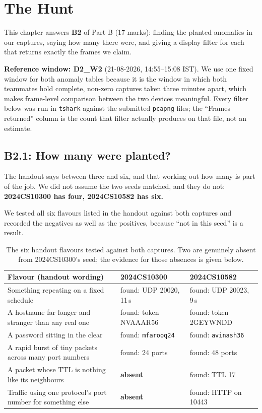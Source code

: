 \chapter{The Hunt}\label{ch:B2}

This chapter answers \textbf{B2} of Part B (17 marks): finding the planted anomalies in our
captures, saying how many there were, and giving a display filter for each that returns exactly
the frames we claim.

\textbf{Reference window: D2\_W2} (21-08-2026, 14:55--15:08 IST). We use one fixed window for
both anomaly tables because it is the window in which both teammates hold complete, non-zero
captures taken three minutes apart, which makes frame-level comparison between the two devices
meaningful. Every filter below was run in \texttt{tshark} against the submitted
\texttt{pcapng} files; the ``Frames returned'' column is the count that filter actually produces
on that file, not an estimate.

\section{B2.1: How many were planted?}

The handout says between three and six, and that working out how many is part of the job. We did
not assume the two seeds matched, and they do not: \textbf{2024CS10300 has four, 2024CS10582 has
six.}

We tested all six flavours listed in the handout against both captures and recorded the
negatives as well as the positives, because ``not in this seed'' is a result.

\begin{table}[H]
\centering
\caption{The six handout flavours tested against both captures. Two are genuinely absent from
2024CS10300's seed; the evidence for those absences is given below.}
\label{tab:b2flavours}
\footnotesize
\begin{tabular}{@{}>{\raggedright\arraybackslash}p{5.6cm}>{\raggedright\arraybackslash}p{3.6cm}>{\raggedright\arraybackslash}p{3.6cm}@{}}
\toprule
Flavour (handout wording) & 2024CS10300 & 2024CS10582 \\
\midrule
Something repeating on a fixed schedule & found: UDP 20020, 11\,s & found: UDP 20023, 9\,s \\
A hostname far longer and stranger than any real one & found: token NVAAAR56 & found: token 2GEYWNDD \\
A password sitting in the clear & found: \texttt{mfarooq24} & found: \texttt{avinash36} \\
A rapid burst of tiny packets across many port numbers & found: 24 ports & found: 48 ports \\
A packet whose TTL is nothing like its neighbours & \textbf{absent} & found: TTL 17 \\
Traffic using one protocol's port number for something else & \textbf{absent} & found: HTTP on 10443 \\
\bottomrule
\end{tabular}
\end{table}

